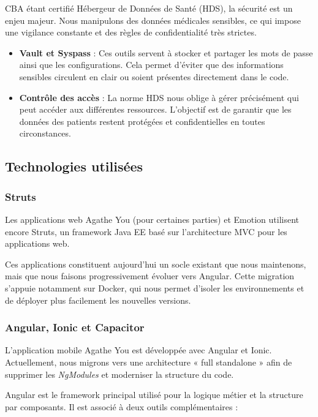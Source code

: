 \documentclass{article}
\begin{document}
CBA étant certifié Hébergeur de Données de Santé (HDS), la sécurité est un enjeu majeur. Nous manipulons des données médicales sensibles, ce qui impose une vigilance constante et des règles de confidentialité très strictes.

\begin{itemize}
    \item \textbf{Vault et Syspass} : Ces outils servent à stocker et partager les mots de passe ainsi que les configurations. Cela permet d'éviter que des informations sensibles circulent en clair ou soient présentes directement dans le code.
    
    \item \textbf{Contrôle des accès} : La norme HDS nous oblige à gérer précisément qui peut accéder aux différentes ressources. L'objectif est de garantir que les données des patients restent protégées et confidentielles en toutes circonstances.
\end{itemize}

\subsection{Technologies utilisées}

\subsubsection{Struts}

Les applications web Agathe You (pour certaines parties) et Emotion utilisent encore Struts, un framework Java EE basé sur l'architecture MVC pour les applications web.

Ces applications constituent aujourd'hui un socle existant que nous maintenons, mais que nous faisons progressivement évoluer vers Angular. Cette migration s'appuie notamment sur Docker, qui nous permet d'isoler les environnements et de déployer plus facilement les nouvelles versions.

\subsubsection{Angular, Ionic et Capacitor}

L'application mobile Agathe You est développée avec Angular et Ionic. Actuellement, nous migrons vers une architecture « full standalone » afin de supprimer les \textit{NgModules} et moderniser la structure du code.

Angular est le framework principal utilisé pour la logique métier et la structure par composants. Il est associé à deux outils complémentaires :
\end{document}
